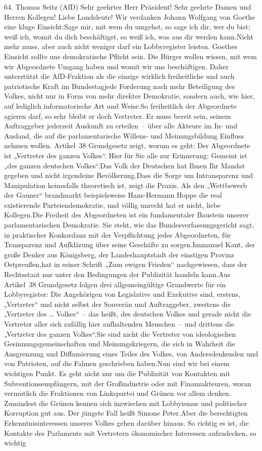 \documentclass{article}
\begin{document}
	64. Thomas Seitz (AfD) Sehr geehrter Herr Präsident! Sehr geehrte Damen und Herren Kollegen! Liebe Landsleute! Wir verdanken Johann Wolfgang von Goethe eine kluge Einsicht:Sage mir, mit wem du umgehst, so sage ich dir, wer du bist; weiß ich, womit du dich beschäftigst, so weiß ich, was aus dir werden kann.Nicht mehr muss, aber auch nicht weniger darf ein Lobbyregister leisten. Goethes Einsicht sollte uns demokratische Pflicht sein. Die Bürger wollen wissen, mit wem wir Abgeordnete Umgang haben und womit wir uns beschäftigen. Daher unterstützt die AfD-Fraktion als die einzige wirklich freiheitliche und auch patriotische Kraft im Bundestagjede Forderung nach mehr Beteiligung des Volkes, nicht nur in Form von mehr direkter Demokratie, sondern auch, wie hier, auf lediglich informatorische Art und Weise.So freiheitlich der Abgeordnete agieren darf, so sehr bleibt er doch Vertreter. Er muss bereit sein, seinem Auftraggeber jederzeit Auskunft zu erteilen – über alle Akteure im In- und Ausland, die auf die parlamentarische Willens- und Meinungsbildung Einfluss nehmen wollen. Artikel 38 Grundgesetz zeigt, worum es geht: Der Abgeordnete ist „Vertreter des ganzen Volkes“. Hier für Sie alle zur Erinnerung: Gemeint ist „des ganzen deutschen Volkes“.Das Volk der Deutschen hat Ihnen Ihr Mandat gegeben und nicht irgendeine Bevölkerung.Dass die Sorge um Intransparenz und Manipulation keinesfalls theoretisch ist, zeigt die Praxis. Als den „Wettbewerb der Gauner“ brandmarkt beispielsweise Hans-Hermann Hoppe die real existierende Parteiendemokratie, und völlig unrecht hat er nicht, liebe Kollegen.Die Freiheit des Abgeordneten ist ein fundamentaler Baustein unserer parlamentarischen Demokratie. Sie steht, wie das Bundesverfassungsgericht sagt, in praktischer Konkordanz mit der Verpflichtung jedes Abgeordneten, für Transparenz und Aufklärung über seine Geschäfte zu sorgen.Immanuel Kant, der große Denker aus Königsberg, der Landeshauptstadt der einstigen Provinz Ostpreußen,hat in seiner Schrift „Zum ewigen Frieden“ nachgewiesen, dass der Rechtsstaat nur unter den Bedingungen der Publizität handeln kann.Aus Artikel 38 Grundgesetz folgen drei allgemeingültige Grundwerte für ein Lobbyregister: Die Angehörigen von Legislative und Exekutive sind, erstens, „Vertreter“ und nicht selbst der Souverän und Auftraggeber, zweitens die „Vertreter des … Volkes“ – das heißt, des deutschen Volkes und gerade nicht die Vertreter aller sich zufällig hier aufhaltenden Menschen – und drittens die „Vertreter des ganzen Volkes“.Sie sind nicht die Vertreter von ideologischen Gesinnungsgemeinschaften und Meinungskriegern, die sich in Wahrheit die Ausgrenzung und Diffamierung eines Teiles des Volkes, von Andersdenkenden und von Patrioten, auf die Fahnen geschrieben haben.Nun sind wir bei einem wichtigen Punkt. Es geht nicht nur um die Publizität von Kontakten mit Subventionsempfängern, mit der Großindustrie oder mit Finanzakteuren, woran vermutlich die Fraktionen von Linkspartei und Grünen vor allem denken. Zumindest die Grünen kennen sich inzwischen mit Lobbyismus und politischer Korruption gut aus. Der jüngste Fall heißt Simone Peter.Aber die berechtigten Erkenntnisinteressen unseres Volkes gehen darüber hinaus. So richtig es ist, die Kontakte des Parlaments mit Vertretern ökonomischer Interessen aufzudecken, so wichtig 
\end{document}
